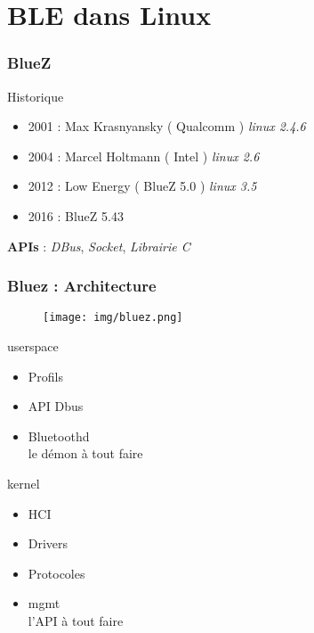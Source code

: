 \section{BLE dans Linux}

\begin{frame}
	\frametitle{BlueZ}
	\begin{block}{Historique}
		\begin{itemize}
			\item 2001 : Max Krasnyansky ( Qualcomm ) {\small{\textit{linux 2.4.6}}}
			\item 2004 : Marcel Holtmann ( Intel ) {\small{\textit{linux 2.6}}}
			\item 2012 : Low Energy ( BlueZ 5.0 ) {\small{\textit{linux 3.5}}}
			\item 2016 : BlueZ 5.43
		\end{itemize}
	\end{block}

	\vspace{1cm}
	\textbf{APIs} : \textit{DBus}, \textit{Socket}, \textit{Librairie C}
\end{frame}

\begin{frame}
	\frametitle{Bluez : Architecture}
	\begin{minipage}{0.50\linewidth}
	\begin{figure}
		\texttt{[image: img/bluez.png]}
	\end{figure}
	\end{minipage}
	\begin{minipage}{0.32\linewidth}
		\begin{block}{userspace}
			\begin{itemize}
				\item Profils
				\item API Dbus
				\item Bluetoothd \\ {\tiny{le démon à tout faire}}
			\end{itemize}
		\end{block}
		\begin{block}{kernel}
			\begin{itemize}
				\item HCI
				\item Drivers
				\item Protocoles
				\item mgmt \\ {\small{l'API à tout faire}}
			\end{itemize}
		\end{block}
	\end{minipage}
\end{frame}

